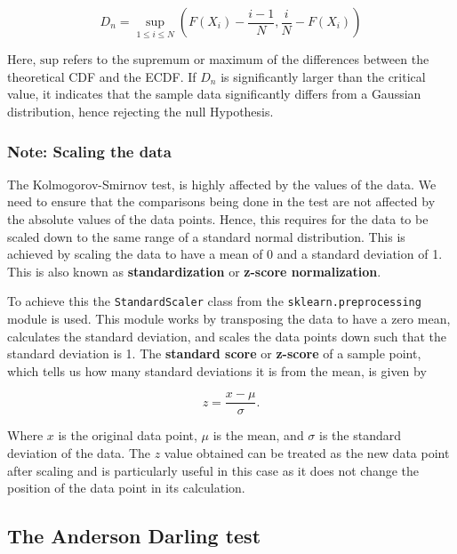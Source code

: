 \documentclass[12pt]{article}
\begin{document}
\begin{equation}
    D_n = \sup_{1 \leq i \leq N} \left( F(X_i) - \frac{i - 1}{N} , \frac{i}{N} - F(X_i) \right)
    \label{eq:ks_statistic}
\end{equation}

\medskip
\noindent Here,  $\text{sup}$ refers to the supremum or maximum of the differences between the theoretical CDF and the ECDF. If $D_n$ is significantly larger than the critical value, it indicates that the sample data significantly differs from a Gaussian distribution, hence rejecting the null Hypothesis.

\subsubsection{Note: Scaling the data}\label{Scaling}

\noindent The Kolmogorov-Smirnov test, is highly affected by the values of the data. We need to ensure that the comparisons being done in the test are not affected by the absolute values of the data points. Hence, this requires for the data to be scaled down to the same range of a standard normal distribution. This is achieved by scaling the data to have a mean of 0 and a standard deviation of 1. This is also known as \textbf{standardization} or \textbf{z-score normalization}.

\medskip
\noindent To achieve this the \texttt{StandardScaler} class from the \texttt{sklearn.preprocessing} module is used. This module works by transposing the data to have a zero mean, calculates the standard deviation, and scales the data points down such that the standard deviation is 1. The \textbf{standard score} or \textbf{z-score} of a sample point, which tells us how many standard deviations it is from the mean, is given by

\begin{equation}
    z = \frac{x - \mu}{\sigma}.
    \label{eq:scaling_formula}
\end{equation}

\medskip
\noindent Where $x$ is the original data point, $\mu$ is the mean, and $\sigma$ is the standard deviation of the data. The $z$ value obtained can be treated as the new data point after scaling and is particularly useful in this case as it does not change the position of the data point in its calculation.

\subsection{The Anderson Darling test}\label{AndersonDarling}
\end{document}
